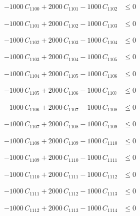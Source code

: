 \documentclass[a4paper,11pt]{article}
\begin{document}
\begin{align}
-1000\,C_{1100} + 2000\,C_{1101} - 1000\,C_{1102} &\leq 0 \nonumber
\end{align}

\begin{align}
-1000\,C_{1101} + 2000\,C_{1102} - 1000\,C_{1103} &\leq 0 \nonumber
\end{align}

\begin{align}
-1000\,C_{1102} + 2000\,C_{1103} - 1000\,C_{1104} &\leq 0 \nonumber
\end{align}

\begin{align}
-1000\,C_{1103} + 2000\,C_{1104} - 1000\,C_{1105} &\leq 0 \nonumber
\end{align}

\begin{align}
-1000\,C_{1104} + 2000\,C_{1105} - 1000\,C_{1106} &\leq 0 \nonumber
\end{align}

\begin{align}
-1000\,C_{1105} + 2000\,C_{1106} - 1000\,C_{1107} &\leq 0 \nonumber
\end{align}

\begin{align}
-1000\,C_{1106} + 2000\,C_{1107} - 1000\,C_{1108} &\leq 0 \nonumber
\end{align}

\begin{align}
-1000\,C_{1107} + 2000\,C_{1108} - 1000\,C_{1109} &\leq 0 \nonumber
\end{align}

\begin{align}
-1000\,C_{1108} + 2000\,C_{1109} - 1000\,C_{1110} &\leq 0 \nonumber
\end{align}

\begin{align}
-1000\,C_{1109} + 2000\,C_{1110} - 1000\,C_{1111} &\leq 0 \nonumber
\end{align}

\begin{align}
-1000\,C_{1110} + 2000\,C_{1111} - 1000\,C_{1112} &\leq 0 \nonumber
\end{align}

\begin{align}
-1000\,C_{1111} + 2000\,C_{1112} - 1000\,C_{1113} &\leq 0 \nonumber
\end{align}

\begin{align}
-1000\,C_{1112} + 2000\,C_{1113} - 1000\,C_{1114} &\leq 0 \nonumber
\end{align}
\end{document}

